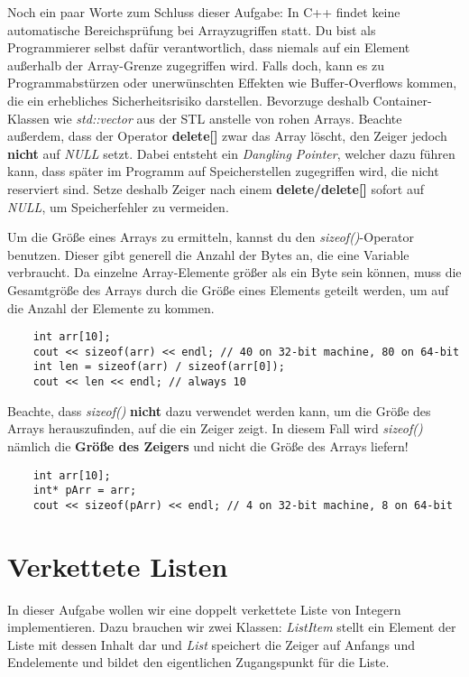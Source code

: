 Noch ein paar Worte zum Schluss dieser Aufgabe:
In C++ findet keine automatische Bereichsprüfung bei Arrayzugriffen statt. Du bist als Programmierer selbst dafür verantwortlich, dass niemals auf ein Element außerhalb der Array-Grenze zugegriffen wird.
Falls doch, kann es zu Programmabstürzen oder unerwünschten Effekten wie  Buffer-Overflows kommen, die ein erhebliches Sicherheitsrisiko darstellen.
Bevorzuge deshalb Container-Klassen wie \emph{std::vector} aus der STL anstelle von \glqq rohen\grqq{} Arrays.
Beachte außerdem, dass der Operator \textbf{delete[]} zwar das Array löscht, den Zeiger jedoch \textbf{nicht} auf \emph{NULL} setzt.
Dabei entsteht ein \emph{Dangling Pointer}, welcher dazu führen kann, dass später im Programm auf Speicherstellen zugegriffen wird, die nicht reserviert sind.
Setze deshalb Zeiger nach einem \textbf{delete/delete[]} sofort auf \emph{NULL}, um Speicherfehler zu vermeiden.

Um die Größe eines Arrays zu ermitteln, kannst du den \emph{sizeof()}-Operator benutzen. Dieser gibt generell die Anzahl der Bytes an, die eine Variable verbraucht. Da einzelne Array-Elemente größer als ein Byte sein können, muss die Gesamtgröße des Arrays durch die Größe eines Elements geteilt werden, um auf die Anzahl der Elemente zu kommen.
\begin{lstlisting}
	int arr[10];
	cout << sizeof(arr) << endl; // 40 on 32-bit machine, 80 on 64-bit
	int len = sizeof(arr) / sizeof(arr[0]); 
	cout << len << endl; // always 10
\end{lstlisting}

Beachte, dass \emph{sizeof()} \textbf{nicht} dazu verwendet werden kann, um die Größe des Arrays herauszufinden, auf die ein Zeiger zeigt. In diesem Fall wird \emph{sizeof()} nämlich die \textbf{Größe des Zeigers} und nicht die Größe des Arrays liefern!
\begin{lstlisting}
	int arr[10];
	int* pArr = arr;
	cout << sizeof(pArr) << endl; // 4 on 32-bit machine, 8 on 64-bit
\end{lstlisting}


\section{Verkettete Listen}
In dieser Aufgabe wollen wir eine doppelt verkettete Liste von Integern implementieren.
Dazu brauchen wir zwei Klassen: 
\emph{ListItem} stellt ein Element der Liste mit dessen Inhalt dar und \emph{List} speichert die Zeiger auf Anfangs und Endelemente und bildet den eigentlichen Zugangspunkt für die Liste.

